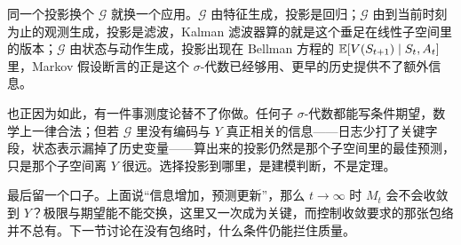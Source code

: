 同一个投影换个 \(\mathcal G\) 就换一个应用。\(\mathcal G\) 由特征生成，投影是回归；\(\mathcal G\) 由到当前时刻为止的观测生成，投影是滤波，Kalman 滤波器算的就是这个垂足在线性子空间里的版本；\(\mathcal G\) 由状态与动作生成，投影出现在 Bellman 方程的 \(\mathbb{E}[V(S_{t+1})\mid S_t,A_t]\) 里，Markov 假设断言的正是这个 \(\sigma\)-代数已经够用、更早的历史提供不了额外信息。

也正因为如此，有一件事测度论替不了你做。任何子 \(\sigma\)-代数都能写条件期望，数学上一律合法；但若 \(\mathcal G\) 里没有编码与 \(Y\) 真正相关的信息——日志少打了关键字段，状态表示漏掉了历史变量——算出来的投影仍然是那个子空间里的最佳预测，只是那个子空间离 \(Y\) 很远。选择投影到哪里，是建模判断，不是定理。

最后留一个口子。上面说``信息增加，预测更新''，那么 \(t\to\infty\) 时 \(M_t\) 会不会收敛到 \(Y\)？极限与期望能不能交换，这里又一次成为关键，而控制收敛要求的那张包络并不总有。下一节讨论在没有包络时，什么条件仍能拦住质量。

